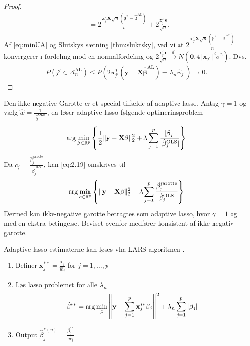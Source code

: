 \begin{proof}
\begin{align*}
&= 2 \frac{\mathbf{x}_{j'}^T \mathbf{X} \sqrt{n} \left(\boldsymbol{\beta}^*-\hat{\boldsymbol{\beta}}^{\text{AL}}\right)}{n}+2\frac{\mathbf{x}_{j'}^T \boldsymbol{\epsilon}}{\sqrt{n}}.
\end{align*}
Af \eqref{eq:minUA} og Slutskys sætning \ref{thm:sluktsky}, ved vi at $ 2 \frac{\mathbf{x}_{j'}^T \mathbf{X} \sqrt{n} \left(\boldsymbol{\beta}^*-\hat{\boldsymbol{\beta}}^{\text{AL}}\right)}{n}$ konvergerer i fordeling mod en normalfordeling og $2\frac{\mathbf{x}_{j'}^T \boldsymbol{\epsilon}}{\sqrt{n}} \overset{d}{\rightarrow} N \left(\mathbf{0}, 4 \Vert \mathbf{x}_{j'} \Vert^2 \sigma^2 \right)$. Dvs.
\begin{align*}
P\left(j' \in \mathcal{A}_n^{\text{AL}}\right) \leq P\left(2 \mathbf{x}_{j'}^T \left(\mathbf{y}-\mathbf{X} \hat{\boldsymbol{\beta}}^{\text{AL}}\right)=\lambda_n \hat{w}_{j'} \right) \rightarrow 0.
\end{align*}
\end{proof}
%
Den ikke-negative Garotte er et special tilfælde af adaptive lasso.
Antag \(\gamma=1\) og vælg \(\hat{w}=\frac{1}{\vert \hat{\beta}^{\text{OLS}} \vert}\), da løser adaptive lasso følgende optimerinsproblem
\begin{align*}
\arg \min_{\beta \in \R^p} \cbr{\frac{1}{2} \Vert \y - \X \beta \Vert_2^2 + \lambda \sum_{j=1}^p \frac{\vert \beta_j \vert}{\vert \hat{\beta}_j^\text{OLS} \vert}}
\end{align*}
Da \(c_j = \frac{\hat{\beta}_j^\text{garotte}}{\hat{\beta}_j^\text{OLS}}\), kan \eqref{eq:2.19} omskrives til
\begin{align*}
\arg \min_{c \in \mathbb{R}^p}  \cbr{\Vert \y - \X \beta \Vert_2^2 + \lambda \sum_{j=1}^p  \frac{\hat{\beta}_j^\text{garotte}}{\hat{\beta}_j^\text{OLS}}}
\end{align*}
Dermed kan ikke-negative garotte betragtes som adaptive lasso, hvor \(\gamma=1\) og med en ekstra betingelse.
Beviset ovenfor medfører konsistent af ikke-negativ garotte.


Adaptive lasso estimaterne kan løses vha LARS algoritmen \citep{efron}.
\begin{enumerate}
\item Definer \(\mathbf{x}_j^{**} = \frac{\mathbf{x}_j}{\hat{w}_j}\) for \(j=1, \ldots, p\)
\item Løs lasso problemet for alle \(\lambda_n\)
\begin{align*}
\hat{\beta}^{**} = \arg \min_{\beta} \left\Vert \mathbf{y} - \sum_{j=1}^p \mathbf{x}_j^{**} \beta_j \right\Vert^2 + \lambda_n \sum_{j=1}^p \vert \beta_j \vert
\end{align*}
\item Output \(\hat{\beta}_j^{*(n)} = \frac{\beta_j^{**}}{\hat{w}_j}\)
\end{enumerate}